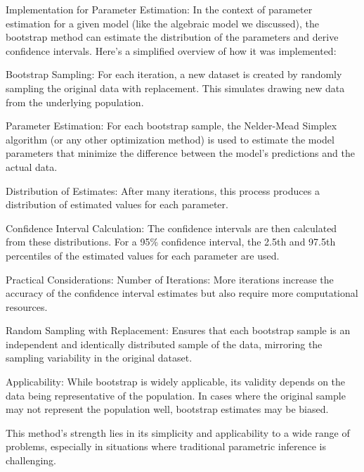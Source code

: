 \documentclass[17pt]{extarticle} %
\begin{document}
Implementation for Parameter Estimation:
In the context of parameter estimation for a given model (like the algebraic model we discussed), the bootstrap method can estimate the distribution of the parameters and derive confidence intervals. Here's a simplified overview of how it was implemented:

Bootstrap Sampling: For each iteration, a new dataset is created by randomly sampling the original data with replacement. This simulates drawing new data from the underlying population.

Parameter Estimation: For each bootstrap sample, the Nelder-Mead Simplex algorithm (or any other optimization method) is used to estimate the model parameters that minimize the difference between the model's predictions and the actual data.

Distribution of Estimates: After many iterations, this process produces a distribution of estimated values for each parameter.

Confidence Interval Calculation: The confidence intervals are then calculated from these distributions. For a 95\% confidence interval, the 2.5th and 97.5th percentiles of the estimated values for each parameter are used.

Practical Considerations:
Number of Iterations: More iterations increase the accuracy of the confidence interval estimates but also require more computational resources.

Random Sampling with Replacement: Ensures that each bootstrap sample is an independent and identically distributed sample of the data, mirroring the sampling variability in the original dataset.

Applicability: While bootstrap is widely applicable, its validity depends on the data being representative of the population. In cases where the original sample may not represent the population well, bootstrap estimates may be biased.

This method's strength lies in its simplicity and applicability to a wide range of problems, especially in situations where traditional parametric inference is challenging.
\end{document}
